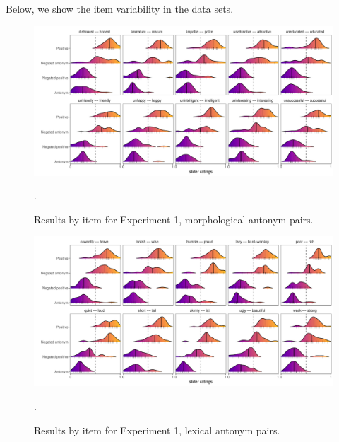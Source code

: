 \documentclass[floatsintext,doc]{apa6}
\begin{document}
Below, we show the item variability in the data sets.




\begin{figure}[t]
\centering \includegraphics{figs/cogsci_expt1_morph_byItem_densities.pdf} 
\caption{Results by item for Experiment 1, morphological antonym pairs.}.\label{fig:items_morph_expt1}
\end{figure}



\begin{figure}[t]
\centering \includegraphics{figs/cogsci_expt1_lex_byItem_densities.pdf} 
\caption{Results by item for Experiment 1, lexical antonym pairs.}.\label{fig:items_lex_expt1}

\end{figure}
\end{document}
